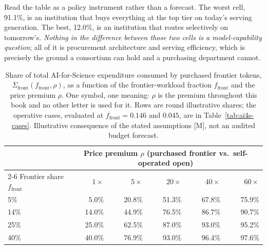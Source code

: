 Read the table as a policy instrument rather than a forecast. The worst cell, 91.1\%, is an institution that buys everything at the top tier on today's serving generation. The best, 12.0\%, is an institution that routes selectively on tomorrow's. \emph{Nothing in the difference between those two cells is a model-capability question}; all of it is procurement architecture and serving efficiency, which is precisely the ground a consortium can hold and a purchasing department cannot.

\begin{table}[htbp]
  \centering
  \small
  \caption{Share of total AI-for-Science expenditure consumed by purchased frontier tokens, $\Sigma_{\mathrm{front}}(f_{\mathrm{front}},\rho)$, as a function of the frontier-workload fraction $f_{\mathrm{front}}$ and the price premium $\rho$. One symbol, one meaning: $\rho$ is the premium throughout this book and no other letter is used for it. Rows are round illustrative shares; the operative cases, evaluated at $f_{\mathrm{front}} = 0.146$ and $0.045$, are in Table~\ref{tab:ai4s-cases}. Illustrative consequence of the stated assumptions [M], not an audited budget forecast.}
  \label{tab:ai4s-cost}
  \begin{tabular}{lrrrrr}
    \toprule
    & \multicolumn{5}{c}{Price premium $\rho$ (purchased frontier vs.\ self-operated open)} \\
    \cmidrule(l){2-6}
    Frontier share $f_{\mathrm{front}}$ & $1\times$ & $5\times$ & $20\times$ & $40\times$ & $60\times$ \\
    \midrule
    5\%  & 5.0\%  & 20.8\% & 51.3\% & 67.8\% & 75.9\% \\
    14\% & 14.0\% & 44.9\% & 76.5\% & 86.7\% & 90.7\% \\
    25\% & 25.0\% & 62.5\% & 87.0\% & 93.0\% & 95.2\% \\
    40\% & 40.0\% & 76.9\% & 93.0\% & 96.4\% & 97.6\% \\
    \bottomrule
  \end{tabular}
\end{table}


